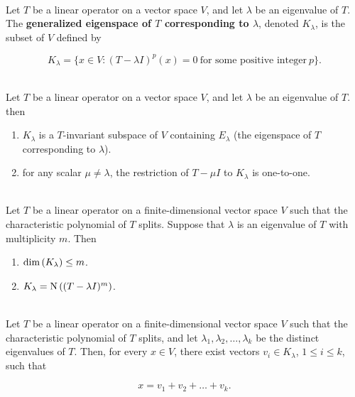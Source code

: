 \begin{definition}
	\hfill\\
	Let $T$ be a linear operator on a vector space $V$, and let $\lambda$ be an eigenvalue of $T$. The \textbf{generalized eigenspace of $T$ corresponding to $\lambda$}, denoted $K_\lambda$, is the subset of $V$ defined by

	\[K_\lambda = \{x \in V : (T - \lambda I)^p(x) = 0\ \text{for some positive integer}\ p\}.\]
\end{definition}

\begin{theorem}\label{Theorem 7.1}
	\hfill\\
	Let $T$ be a linear operator on a vector space $V$, and let $\lambda$ be an eigenvalue of $T$. then

	\begin{enumerate}
		\item $K_\lambda$ is a $T$-invariant subspace of $V$ containing $E_\lambda$ (the eigenspace of $T$ corresponding to $\lambda$).
		\item for any scalar $\mu \neq \lambda$, the restriction of $T - \mu I$ to $K_\lambda$ is one-to-one.
	\end{enumerate}
\end{theorem}

\begin{theorem}
	\hfill\\
	Let $T$ be a linear operator on a finite-dimensional vector space $V$ such that the characteristic polynomial of $T$ splits. Suppose that $\lambda$ is an eigenvalue of $T$ with multiplicity $m$. Then

	\begin{enumerate}
		\item $\text{dim}\left(K_\lambda\right) \leq m$.
		\item $K_\lambda = \text{N}\left((T - \lambda I)^m\right)$.
	\end{enumerate}
\end{theorem}

\begin{theorem}
	\hfill\\
	Let $T$ be a linear operator on a finite-dimensional vector space $V$ such that the characteristic polynomial of $T$ splits, and let $\lambda_1, \lambda_2, \dots, \lambda_k$ be the distinct eigenvalues of $T$. Then, for every $x \in V$, there exist vectors $v_i \in K_\lambda$, $1 \leq i \leq k$, such that

	\[x = v_1 + v_2 + \dots + v_k.\]
\end{theorem}

